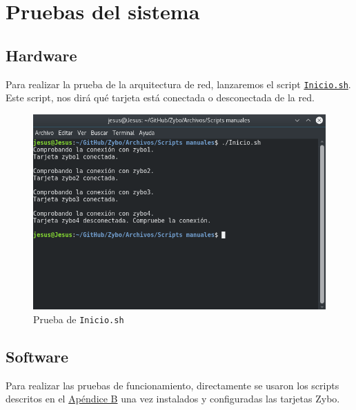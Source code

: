 \section{Pruebas del sistema}
\subsection{Hardware}
Para realizar la prueba de la arquitectura de red, lanzaremos el script \hyperlink{ScriptConexion}{\texttt{Inicio.sh}}. Este script, nos dirá qué tarjeta está conectada o desconectada de la red.

\begin{figure}[h]
	\centering
	\includegraphics[scale=0.5]{Metodologia/Pruebas/Prueba_Inicio_sh.png}
	\caption{Prueba de \texttt{Inicio.sh}}
	\label{Prueba de Inicio.sh}
\end{figure}

\subsection{Software}
Para realizar las pruebas de funcionamiento, directamente se usaron los scripts descritos en el \hyperlink{Scripts}{Apéndice B} una vez instalados y configuradas las tarjetas Zybo.

